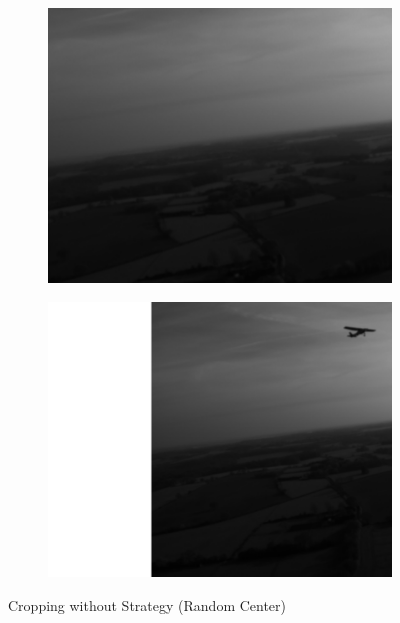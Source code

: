 {\begin{figure}[p]
\begin{subfigure}[][][t]{0.3\textwidth}
  \end{subfigure}
  \begin{subfigure}[][][t]{0.3\textwidth}
      \includegraphics[width=1\linewidth]{figures/crop_strat_illegal2.png}
  \end{subfigure}
  \begin{subfigure}[][][t]{0.3\textwidth}
      \includegraphics[width=1\linewidth]{figures/crop_strat_illegal3.png}
  \end{subfigure}
  \caption{Cropping without Strategy (Random Center)}
  \label{fig:crop-illegal}
\end{figure}
}
